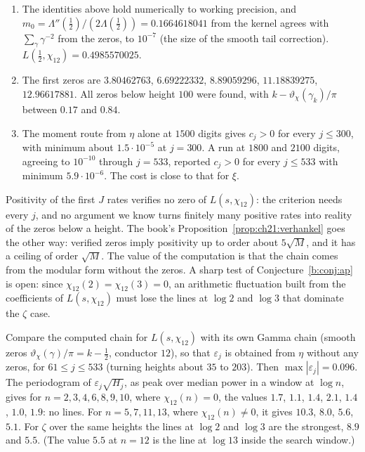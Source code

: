 \begin{remark}\label{b:comp:eta}
\begin{enumerate}
\item The identities above hold numerically to working precision, and $m_0=\Lambda''(\tfrac12)/(2\Lambda(\tfrac12))=0.1664618041$ from the kernel agrees with $\sum_\gamma \gamma^{-2}$ from the zeros, to $10^{-7}$ (the size of the smooth tail correction). $L(\tfrac12,\chi_{12})=0.4985570025$.
\item The first zeros are $3.80462763$, $6.69222332$, $8.89059296$, $11.18839275$, $12.96617881$. All zeros below height $100$ were found, with $k-\vartheta_\chi(\gamma_k)/\pi$ between $0.17$ and $0.84$.
\item The moment route from $\eta$ alone at $1500$ digits gives $c_j>0$ for every $j\le300$, with minimum about $1.5\cdot10^{-5}$ at $j=300$. A run at $1800$ and $2100$ digits, agreeing to $10^{-10}$ through $j=533$, reported $c_j>0$ for every $j\le533$ with minimum $5.9\cdot10^{-6}$. The cost is close to that for $\xi$.
\end{enumerate}
\end{remark}

Positivity of the first $J$ rates verifies no zero of $L(s,\chi_{12})$: the criterion needs every $j$, and no argument we know turns finitely many positive rates into reality of the zeros below a height. The book's Proposition~\ref{prop:ch21:verhankel} goes the other way: verified zeros imply positivity up to order about $5\sqrt M$, and it has a ceiling of order $\sqrt M$. The value of the computation is that the chain comes from the modular form without the zeros. A sharp test of Conjecture~\ref{b:conj:ap} is open: since $\chi_{12}(2)=\chi_{12}(3)=0$, an arithmetic fluctuation built from the coefficients of $L(s,\chi_{12})$ must lose the lines at $\log2$ and $\log3$ that dominate the $\zeta$ case. %

\begin{remark}\label{b:comp:etalines}
Compare the computed chain for $L(s,\chi_{12})$ with its own Gamma chain (smooth zeros $\vartheta_\chi(\gamma)/\pi=k-\frac12$, conductor $12$), so that $\varepsilon_j$ is obtained from $\eta$ without any zeros, for $61\le j\le533$ (turning heights about $35$ to $203$). Then $\max|\varepsilon_j|=0.096$. The periodogram of $\varepsilon_j\sqrt{H_j}$, as peak over median power in a window at $\log n$, gives for $n=2,3,4,6,8,9,10$, where $\chi_{12}(n)=0$, the values $1.7$, $1.1$, $1.4$, $2.1$, $1.4$, $1.0$, $1.9$: no lines. For $n=5,7,11,13$, where $\chi_{12}(n)\ne0$, it gives $10.3$, $8.0$, $5.6$, $5.1$. For $\zeta$ over the same heights the lines at $\log2$ and $\log3$ are the strongest, $8.9$ and $5.5$. (The value $5.5$ at $n=12$ is the line at $\log13$ inside the search window.)
\end{remark}

